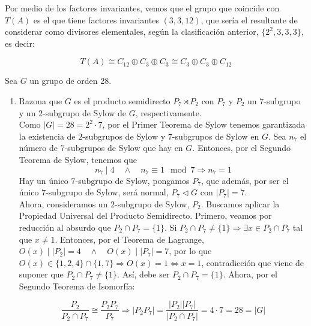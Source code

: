 \documentclass[12pt]{article}
\begin{document}
\begin{ejercicio}[2 puntos]
\begin{enumerate}[label=(\alph*)]
            Por medio de los factores invariantes, vemos que el grupo que coincide con $T(A)$ es el que tiene factores invariantes $(3,3,12)$, que sería el resultante de considerar como divisores elementales, según la clasificación anterior, $\{2^2, 3, 3, 3\}$, es decir:

            $$T(A) \cong C_{12} \oplus C_3 \oplus C_3 \cong C_3 \oplus C_3 \oplus C_{12}$$

        \end{enumerate}
    \end{ejercicio}

    \begin{ejercicio}[2 puntos]
        Sea $G$ un grupo de orden 28.
        \begin{enumerate}[label=(\alph*)]
            \item Razona que $G$ es el producto semidirecto $P_7 \rtimes P_2$ con $P_7$ y $P_2$ un $7$-subgrupo y un $2$-subgrupo de Sylow de $G$, respectivamente. \\
            
            Como $|G| = 28 = 2^2 \cdot 7$, por el Primer Teorema de Sylow tenemos garantizada la existencia de $2$-subgrupos de Sylow y 7-subgrupos de Sylow en $G$. Sea $n_7$ el número de $7$-subgrupos de Sylow que hay en $G$. Entonces, por el Segundo Teorema de Sylow, tenemos que
            $$n_7 \mid 4 \quad \land \quad n_7 \equiv 1 \mod 7 \Longrightarrow n_7 = 1$$
            Hay un único $7$-subgrupo de Sylow, pongamos $P_7$, que además, por ser el único $7$-subgrupo de Sylow, será normal, $P_7 \vartriangleleft G$ con $|P_7| = 7$. \\

            Ahora, consideramos un $2$-subgrupo de Sylow, $P_2$. Buscamos aplicar la Propiedad Universal del Producto Semidirecto. Primero, veamos por reducción al absurdo que $P_2 \cap P_7 = \{1\}$. 
            Si $P_2 \cap P_7 \neq \{1\} \Longrightarrow \exists x \in P_2 \cap P_7$ tal que $x \neq 1$. Entonces, por el Teorema de Lagrange, $O(x) \mid |P_2| = 4 \quad \land \quad O(x) \mid |P_7| = 7$, por lo que $O(x) \in \{1,2,4\} \cap \{1,7\} \Longrightarrow O(x) = 1 \iff x = 1$, 
            contradicción que viene de suponer que $P_2 \cap P_7 \neq \{1\}$. Así, debe ser $P_2 \cap P_7 = \{1\}$. Ahora, por el Segundo Teorema de Isomorfía:

            $$\dfrac{P_2}{P_2 \cap P_7} \cong \dfrac{P_2 P_7}{P_7} \Longrightarrow |P_2P_7| = \dfrac{|P_2| |P_7|}{|P_2 \cap P_7|} = 4 \cdot 7 = 28 = |G|$$


\end{enumerate}
\end{ejercicio}
\end{document}
